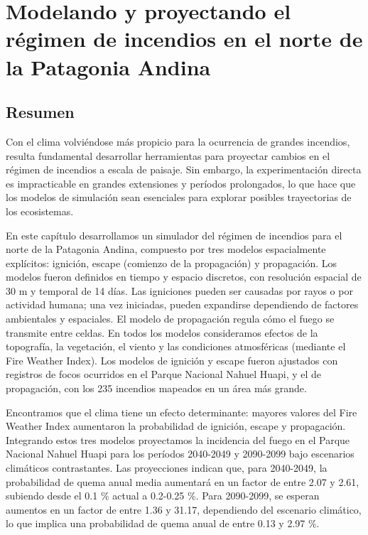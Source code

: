 \newpage{\ }
\cleardoublepage

\chapter[Capítulo 4. Modelando y proyectando el régimen de incendios en el norte de la Patagonia Andina]{Modelando y proyectando el régimen de incendios en el norte de la Patagonia Andina}\label{cap:modelos}

\section*{Resumen}

Con el clima volviéndose más propicio para la ocurrencia de grandes incendios, resulta fundamental desarrollar herramientas para proyectar cambios en el régimen de incendios a escala de paisaje. Sin embargo, la experimentación directa es impracticable en grandes extensiones y períodos prolongados, lo que hace que los modelos de simulación sean esenciales para explorar posibles trayectorias de los ecosistemas. 

En este capítulo desarrollamos un simulador del régimen de incendios para el norte de la Patagonia Andina, compuesto por tres modelos espacialmente explícitos: ignición, escape (comienzo de la propagación) y propagación. Los modelos fueron definidos en tiempo y espacio discretos, con resolución espacial de 30 m y temporal de 14 días. Las igniciones pueden ser causadas por rayos o por actividad humana; una vez iniciadas, pueden expandirse dependiendo de factores ambientales y espaciales. El modelo de propagación regula cómo el fuego se transmite entre celdas. En todos los modelos consideramos efectos de la topografía, la vegetación, el viento y las condiciones atmosféricas (mediante el Fire Weather Index). Los modelos de ignición y escape fueron ajustados con registros de focos ocurridos en el Parque Nacional Nahuel Huapi, y el de propagación, con los 235 incendios mapeados en un área más grande. 

Encontramos que el clima tiene un efecto determinante: mayores valores del Fire Weather Index aumentaron la probabilidad de ignición, escape y propagación. Integrando estos tres modelos proyectamos la incidencia del fuego en el Parque Nacional Nahuel Huapi para los períodos 2040-2049 y 2090-2099 bajo escenarios climáticos contrastantes. Las proyecciones indican que, para 2040-2049, la probabilidad de quema anual media aumentará en un factor de entre 2.07 y 2.61, subiendo desde el 0.1 \% actual a 0.2-0.25 \%. Para 2090-2099, se esperan aumentos en un factor de entre 1.36 y 31.17, dependiendo del escenario climático, lo que implica una probabilidad de quema anual de entre 0.13 y 2.97 \%.

